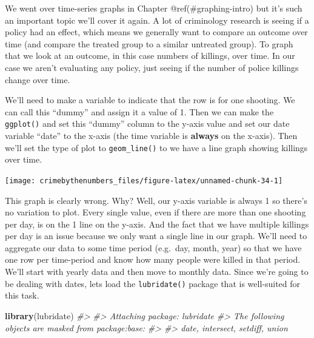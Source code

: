 \documentclass[
  12pt,
]{book}
\newenvironment{Shaded}{\begin{snugshade}}{\end{snugshade}}
\newcommand{\CommentTok}[1]{\textcolor[rgb]{0.37,0.37,0.37}{\textit{#1}}}
\newcommand{\DataTypeTok}[1]{\textcolor[rgb]{0.27,0.27,0.27}{#1}}
\newcommand{\DecValTok}[1]{\textcolor[rgb]{0.06,0.06,0.06}{#1}}
\newcommand{\KeywordTok}[1]{\textcolor[rgb]{0.27,0.27,0.27}{\textbf{#1}}}
\newcommand{\NormalTok}[1]{#1}
\newcommand{\OperatorTok}[1]{\textcolor[rgb]{0.43,0.43,0.43}{\textbf{#1}}}
\newcommand{\StringTok}[1]{\textcolor[rgb]{0.5,0.5,0.5}{#1}}
\begin{document}
We went over time-series graphs in Chapter @ref(\#graphing-intro) but it's such an important topic we'll cover it again. A lot of criminology research is seeing if a policy had an effect, which means we generally want to compare an outcome over time (and compare the treated group to a similar untreated group). To graph that we look at an outcome, in this case numbers of killings, over time. In our case we aren't evaluating any policy, just seeing if the number of police killings change over time.

We'll need to make a variable to indicate that the row is for one shooting. We can call this ``dummy'' and assign it a value of 1. Then we can make the \texttt{ggplot()} and set this ``dummy'' column to the y-axis value and set our date variable ``date'' to the x-axis (the time variable is \textbf{always} on the x-axis). Then we'll set the type of plot to \texttt{geom\_line()} to we have a line graph showing killings over time.

\begin{Shaded}
\end{Shaded}

\begin{center}\texttt{[image: crimebythenumbers\_files/figure-latex/unnamed-chunk-34-1]} \end{center}

This graph is clearly wrong. Why? Well, our y-axis variable is always 1 so there's no variation to plot. Every single value, even if there are more than one shooting per day, is on the 1 line on the y-axis. And the fact that we have multiple killings per day is an issue because we only want a single line in our graph. We'll need to aggregate our data to some time period (e.g.~day, month, year) so that we have one row per time-period and know how many people were killed in that period. We'll start with yearly data and then move to monthly data. Since we're going to be dealing with dates, lets load the \texttt{lubridate()} package that is well-suited for this task.

\begin{Shaded}
\begin{Highlighting}[]
\KeywordTok{library}\NormalTok{(lubridate)}
\CommentTok{\#> }
\CommentTok{\#> Attaching package: \textquotesingle{}lubridate\textquotesingle{}}
\CommentTok{\#> The following objects are masked from \textquotesingle{}package:base\textquotesingle{}:}
\CommentTok{\#> }
\CommentTok{\#>     date, intersect, setdiff, union}
\end{Highlighting}
\end{Shaded}
\end{document}
